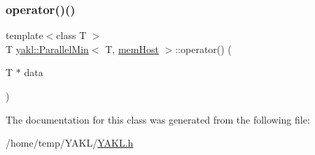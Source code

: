 \mbox{\label{classyakl_1_1ParallelMin_3_01T_00_01memHost_01_4_af9e3dfca7468cea66e3a007dda830cb2}} 
\subsubsection{\texorpdfstring{operator()()}{operator()()}}
{\footnotesize\ttfamily template$<$class T $>$ \\
T \hyperlink{classyakl_1_1ParallelMin}{yakl\+::\+Parallel\+Min}$<$ T, \hyperlink{namespaceyakl_aae8a8c910fec7cef7db68c9658c16405}{mem\+Host} $>$\+::operator() (\begin{DoxyParamCaption}\item[{T $\ast$}]{data }\end{DoxyParamCaption})\hspace{0.3cm}{\ttfamily [inline]}}



The documentation for this class was generated from the following file\+:\begin{DoxyCompactItemize}
\item 
/home/temp/\+Y\+A\+K\+L/\hyperlink{YAKL_8h}{Y\+A\+K\+L.\+h}\end{DoxyCompactItemize}
